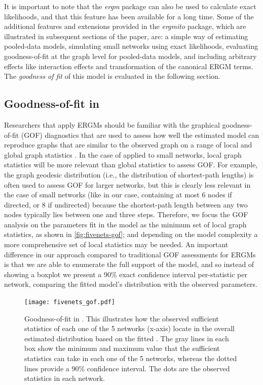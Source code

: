 \documentclass[review, nonatbib,doubleblind]{elsarticle/elsarticle}
\begin{document}


It is important to note that the \textit{ergm} package can also be used to calculate exact likelihoods, and that this feature has been available for a long time. Some of the additional features and extensions provided in the \textit{ergmito} package, which are illustrated in subsequent sections of the paper, are: a simple way of estimating pooled-data models, simulating small networks using exact likelihoods, evaluating goodness-of-fit at the graph level for pooled-data models, and including arbitrary effects like interaction effects and transformation of the canonical ERGM terms. The \textit{goodness of fit} of this model is evaluated in the following section.


\subsection{Goodness-of-fit in \ergmitos}

Researchers that apply ERGMs should be familiar with the graphical goodness-of-fit (GOF) diagnostics that are used to assess how well the estimated model can reproduce graphs that are similar to the observed graph on a range of local and global graph statistics \cite{Hunteretal2008}. In the case of \ergmitos{} applied to small networks, local graph statistics will be more relevant than global statistics to assess GOF. For example, the graph geodesic distribution (i.e., the distribution of shortest-path lengths) is often used to assess GOF for larger networks, but this is clearly less relevant in the case of small networks (like in our case, containing at most 6 nodes if directed, or 8 if undirected) because the shortest-path length between any two nodes typically lies between one and three steps. Therefore, we focus the GOF analysis on the parameters fit in the model as the minimum set of local graph statistics, as shown in \autoref{fig:fivenets-gof}; and depending on the model complexity a more comprehensive set of local statistics may be needed. An important difference in our approach compared to traditional GOF assessments for ERGMs is that we are able to enumerate the full support of the model, and so instead of showing a boxplot we present a 90\% exact confidence interval per-statistic per network, comparing the fitted model's distribution with the observed parameters. %

\begin{figure}[tb]
    \centering
    \caption{Goodness-of-fit in \ergmitos{}. This illustrates how the observed sufficient statistics of each one of the 5 networks (x-axis) locate in the overall estimated distribution based on the fitted \ergmito{}. The gray lines in each box show the minimum and maximum value that the sufficient statistics can take in each one of the 5 networks, whereas the dotted lines provide a 90\% confidence interval. The dots are the observed statistics in each network.}
    \texttt{[image: fivenets\_gof.pdf]}
    \label{fig:fivenets-gof}
\end{figure}
\end{document}
